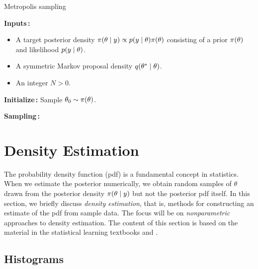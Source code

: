 \begin{algorithm}[H]
\caption{Metropolis sampling}
\label{alg:metropolis}
\SetAlgoLined
\DontPrintSemicolon
 \textbf{Inputs\,:}\;
 \vspace{-5mm}
 \begin{itemize}
     \item A target posterior density $\pi \qty(\theta \mid y) \propto p \qty(y \mid \theta) \pi \qty(\theta)$ consisting of a prior $\pi \qty(\theta)$ and likelihood $p \qty(y \mid \theta)$. 
     \item A symmetric Markov proposal density $q \qty(\theta^* \mid \theta)$.
     \item An integer $N>0$.
 \end{itemize}
 
 \vspace{5mm}
 \textbf{Initialize\,:}\;
 Sample $\theta_0 \sim \pi \qty(\theta)$.\;

 \vspace{5mm}
 \textbf{Sampling\,:}\;
\end{algorithm}



\section{Density Estimation}

The probability density function (pdf) is a fundamental concept in statistics. When we estimate the posterior numerically, we obtain random samples of $\theta$ drawn from the posterior density $\pi \qty(\theta \mid y)$ but not the posterior pdf itself. In this section, we briefly discuss \textit{density estimation}, that is, methods for constructing an estimate of the pdf from sample data. The focus will be on \textit{nonparametric} approaches to density estimation. The content of this section is based on the material in the statistical learning textbooks \cite{ESL} and \cite{Bishop}.

\subsection{Histograms} 


